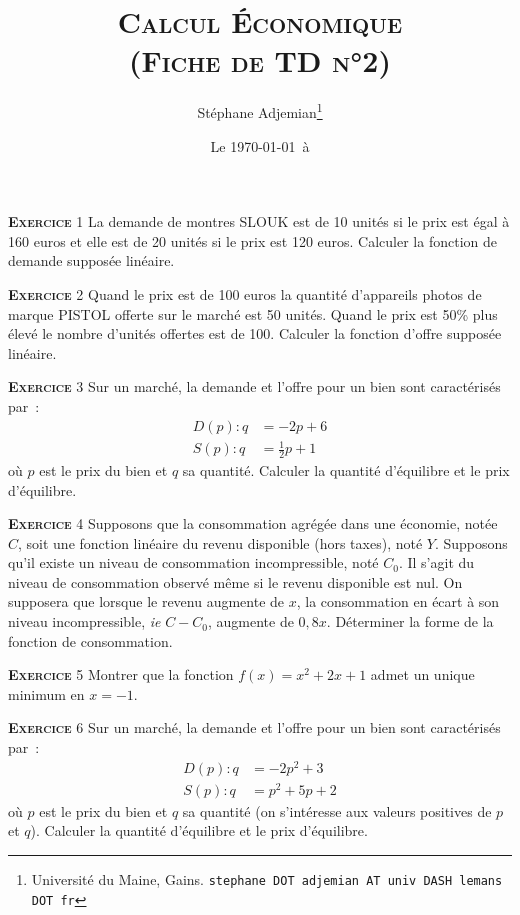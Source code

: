 \documentclass[10pt,a4paper,notitlepage]{article}
\newcommand{\exercice}[1]{\textsc{\textbf{Exercice}} #1}
\begin{document}
\title{\textsc{Calcul Économique\\ \small{(Fiche de TD n°2)}}}
\author{Stéphane Adjemian\thanks{Université du Maine, Gains. \texttt{stephane DOT adjemian AT univ DASH lemans DOT fr}}}
\date{Le \today\ à \thistime}

\maketitle

\exercice{1} La demande de montres SLOUK est de 10 unités si le prix est
égal à 160 euros et elle est de 20 unités si le prix est 120
euros. Calculer la fonction de demande supposée linéaire.

\bigskip

\exercice{2} Quand le prix est de 100 euros la quantité d'appareils
photos de marque PISTOL offerte sur le marché est 50 unités. Quand le
prix est 50\% plus élevé le nombre d'unités offertes est de
100. Calculer la fonction d'offre supposée linéaire.

\bigskip

\exercice{3} Sur un marché, la demande et l'offre pour un bien sont
caractérisés par :
\[
\begin{split}
  D(p): q &= -2 p  + 6\\
  S(p): q &= \frac{1}{2} p  + 1
\end{split}
\]
où $p$ est le prix du bien et $q$ sa quantité. Calculer la quantité
d'équilibre et le prix d'équilibre.

\bigskip

\exercice{4} Supposons que la consommation agrégée dans une économie,
notée $C$, soit une fonction linéaire du revenu disponible (hors
taxes), noté $Y$. Supposons qu'il existe un niveau de consommation
incompressible, noté $C_0$. Il s'agit du niveau de consommation
observé même si le revenu disponible est nul. On supposera que lorsque
le revenu augmente de $x$, la consommation en écart à son niveau
incompressible, \emph{ie} $C-C_0$, augmente de $0,8x$. Déterminer la
forme de la fonction de consommation.

\bigskip

\exercice{5} Montrer que la fonction $f(x) = x^2+2x+1$ admet un unique
minimum en $x=-1$.

\bigskip

\exercice{6} Sur un marché, la demande et l'offre pour un bien sont
caractérisés par :
\[
\begin{split}
  D(p): q &= -2 p^2  + 3\\
  S(p): q &= p^2 + 5p +2
\end{split}
\]
où $p$ est le prix du bien et $q$ sa quantité (on s'intéresse aux
valeurs positives de $p$ et $q$). Calculer la quantité
d'équilibre et le prix d'équilibre.
\end{document}
